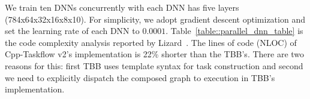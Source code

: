 \documentclass[conference]{IEEEtran}
\begin{document}
We train ten DNNs concurrently with each DNN has five layers (784x64x32x16x8x10).
For simplicity, we adopt gradient descent optimization and set the learning rate of each DNN to $0.0001$.
Table~\ref{table::parallel_dnn_table} is the code complexity analysis reported by Lizard~\cite{lizard}.  
The lines of code (NLOC) of Cpp-Taskflow v2's implementation is 22\% shorter than the TBB's. 
There are two reasons for this: first TBB uses template syntax for task construction and 
second we need to explicitly dispatch the composed graph to execution in TBB's implementation. 
\end{document}

